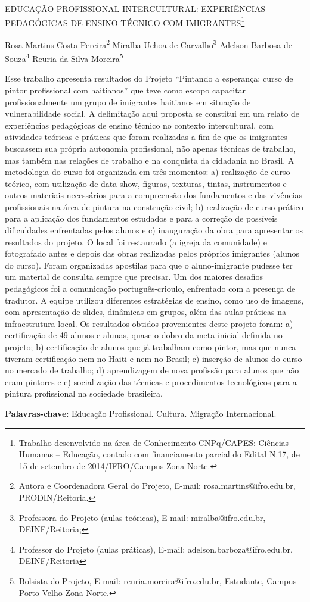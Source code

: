 \documentclass[article,12pt,onesidea,4paper,english,brazil]{abntex2}
\begin{document}
	
	
	\frenchspacing 
	
	\begin{center}
		\LARGE EDUCAÇÃO PROFISSIONAL INTERCULTURAL: EXPERIÊNCIAS PEDAGÓGICAS DE ENSINO TÉCNICO COM  IMIGRANTES\footnote{Trabalho desenvolvido na área de Conhecimento CNPq/CAPES: Ciências Humanas – Educação, contado com financiamento parcial do Edital N.17, de 15 de setembro de 2014/IFRO/Campus Zona Norte.}
		
		\normalsize
		Rosa Martins Costa Pereira\footnote{Autora e Coordenadora Geral do Projeto, E-mail: rosa.martins@ifro.edu.br, PRODIN/Reitoria.} 
	    Miralba Uchoa de Carvalho\footnote{Professora do Projeto (aulas teóricas), E-mail: miralba@ifro.edu.br, DEINF/Reitoria;} 
		Adelson Barbosa de Souza\footnote{Professor do Projeto (aulas práticas), E-mail: adelson.barboza@ifro.edu.br, DEINF/Reitoria} 
		Reuria da Silva Moreira\footnote{Bolsista do Projeto, E-mail: reuria.moreira@ifro.edu.br, Estudante, Campus Porto Velho Zona Norte. } 
	\end{center}
	
	\noindent Esse trabalho apresenta resultados do Projeto “Pintando a esperança: curso de pintor profissional com haitianos” que teve como escopo capacitar profissionalmente um grupo de imigrantes haitianos em situação de vulnerabilidade social. A delimitação aqui proposta se constitui em um relato de experiências pedagógicas de ensino técnico no contexto intercultural, com atividades teóricas e práticas que foram realizadas a fim de que os imigrantes buscassem sua própria autonomia profissional, não apenas técnicas de trabalho, mas também nas relações de trabalho e na conquista da cidadania no Brasil. A metodologia do curso foi organizada em três momentos: a) realização de curso teórico, com utilização de data show, figuras, texturas, tintas, instrumentos e outros materiais necessários para a compreensão dos fundamentos e das vivências profissionais na área de pintura na construção civil; b) realização de curso prático para a aplicação dos fundamentos estudados e para a correção de possíveis dificuldades enfrentadas pelos alunos e c) inauguração da obra para apresentar os resultados do projeto. O local foi restaurado (a igreja da comunidade) e fotografado antes e depois das obras realizadas pelos próprios imigrantes (alunos do curso). Foram organizadas apostilas para que o aluno-imigrante pudesse ter um material de consulta sempre que precisar. Um dos maiores desafios pedagógicos foi a comunicação português-crioulo, enfrentado com a presença de tradutor. A equipe utilizou diferentes estratégias de ensino, como uso de imagens, com apresentação de slides, dinâmicas em grupos, além das aulas práticas na infraestrutura local.  Os resultados obtidos provenientes deste projeto foram: a) certificação de 49 alunos e alunas, quase o dobro da meta inicial definida no projeto; b) certificação de alunos que já trabalham como pintor, mas que nunca tiveram certificação nem no Haiti e nem no Brasil; c) inserção de alunos do curso no mercado de trabalho; d) aprendizagem de nova profissão para alunos que não eram pintores e e) socialização das técnicas e procedimentos tecnológicos para a pintura profissional na sociedade brasileira.
	
	\vspace{\onelineskip}
	
	\noindent
	\textbf{Palavras-chave}: Educação Profissional. Cultura. Migração Internacional.
	
\end{document}
